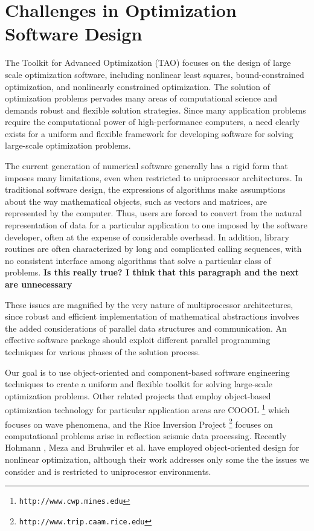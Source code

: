 \section{Challenges in Optimization Software Design}

\setcounter{footnote}{0}
\renewcommand{\thefootnote}{\arabic{footnote}}

The Toolkit for Advanced Optimization (TAO) focuses on the design of large
scale optimization software, including nonlinear least
squares,  bound-constrained
optimization, and nonlinearly constrained optimization.
The solution of optimization problems
pervades many areas of computational science and demands robust and
flexible solution strategies.
Since many application problems require the computational
power of high-performance computers, a need clearly exists for a
uniform and flexible
framework for developing software for solving large-scale
optimization problems.

The current generation of numerical software generally has a rigid form
that imposes many limitations, even when restricted to
uniprocessor architectures.
In traditional software design, the expressions of
algorithms make assumptions about the way mathematical objects, such as
vectors and matrices, are represented by the computer.
Thus, users are
forced to convert from the natural representation of data for a particular
application to one imposed by the software developer, often at the
expense of considerable overhead.  In addition, library routines are
often characterized by long and complicated calling sequences, with
no consistent interface among algorithms that solve a particular class
of problems.
\textbf{Is this really true? I think that this paragraph
and the next are unnecessary}

These issues are magnified by the very nature of multiprocessor
architectures, since robust and
efficient implementation of mathematical abstractions involves
the added considerations
of parallel data structures and communication.
An effective software package should
exploit different parallel programming
techniques for various phases of the solution process.

Our goal is to use object-oriented and component-based
software engineering techniques to create  a
uniform and flexible toolkit for solving large-scale
optimization problems.
Other related projects that employ 
object-based optimization technology for
particular application areas are 
COOOL%
\footnote{\texttt{http://www.cwp.mines.edu}}
which focuses on wave phenomena,
and the 
Rice Inversion Project%
\footnote{\texttt{http://www.trip.caam.rice.edu}}
focuses on computational
problems arise in reflection seismic data processing.
Recently Hohmann \cite{hohmann:94}, Meza \cite{meza:94}
and Bruhwiler et al. \cite{bsca98} have employed object-oriented design
for nonlinear optimization, although their work addresses only some
the the issues we consider and is restricted to uniprocessor environments.


